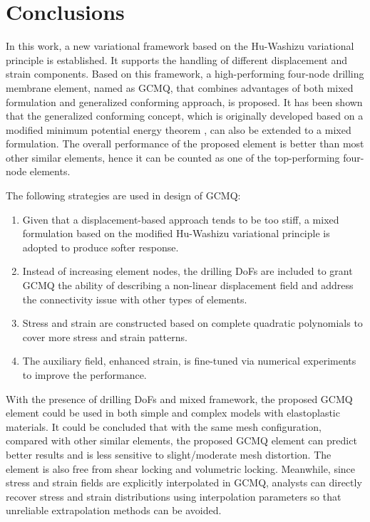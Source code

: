 \documentclass[3p,sort&compress,review,11pt]{elsarticle}
\begin{document}
\section{Conclusions}
In this work, a new variational framework based on the Hu-Washizu variational principle is established. It supports the handling of different displacement and strain components. Based on this framework, a high-performing four-node drilling membrane element, named as GCMQ, that combines advantages of both mixed formulation and generalized conforming approach, is proposed. It has been shown that the generalized conforming concept, which is originally developed based on a modified minimum potential energy theorem \citep{Long2009}, can also be extended to a mixed formulation. The overall performance of the proposed element is better than most other similar elements, hence it can be counted as one of the top-performing four-node elements.

The following strategies are used in design of GCMQ:
\begin{enumerate}
\item Given that a displacement-based approach tends to be too stiff, a mixed formulation based on the modified Hu-Washizu variational principle is adopted to produce softer response.
\item Instead of increasing element nodes, the drilling DoFs are included to grant GCMQ the ability of describing a non-linear displacement field and address the connectivity issue with other types of elements.
\item Stress and strain are constructed based on complete quadratic polynomials to cover more stress and strain patterns.
\item The auxiliary field, enhanced strain, is fine-tuned via numerical experiments to improve the performance.
\end{enumerate}

With the presence of drilling DoFs and mixed framework, the proposed GCMQ element could be used in both simple and complex models with elastoplastic materials. It could be concluded that with the same mesh configuration, compared with other similar elements, the proposed GCMQ element can predict better results and is less sensitive to slight/moderate mesh distortion. The element is also free from shear locking and volumetric locking. Meanwhile, since stress and strain fields are explicitly interpolated in GCMQ, analysts can directly recover stress and strain distributions using interpolation parameters so that unreliable extrapolation methods can be avoided.
\end{document}
